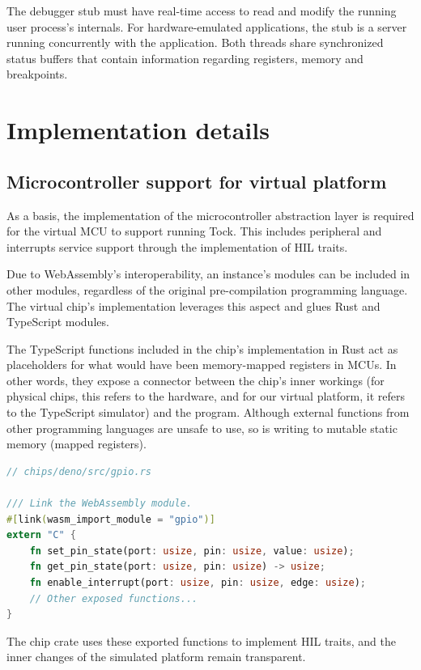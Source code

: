 \documentclass[12pt,a4paper]{report}
\begin{document}
The debugger stub must have real-time access to read and modify the running user process's internals. For hardware-emulated applications, the stub is a server running concurrently with the application. Both threads share synchronized status buffers that contain information regarding registers, memory and breakpoints.

\chapter{Implementation details}

\section{Microcontroller support for virtual platform}

As a basis, the implementation of the microcontroller abstraction layer is required for the virtual MCU to support running Tock. This includes peripheral and interrupts service support through the implementation of HIL traits.

Due to WebAssembly's interoperability, an instance's modules can be included in other modules, regardless of the original pre-compilation programming language. The virtual chip's implementation leverages this aspect and glues Rust and TypeScript modules. 

The TypeScript functions included in the chip's implementation in Rust act as placeholders for what would have been memory-mapped registers in MCUs. In other words, they expose a connector between the chip's inner workings (for physical chips, this refers to the hardware, and for our virtual platform, it refers to the TypeScript simulator) and the program. Although external functions from other programming languages are unsafe to use, so is writing  to mutable static memory (mapped registers).

\begin{lstlisting}[caption=TypeScript functions imported in Rust from the gpio module, language=Rust]
// chips/deno/src/gpio.rs

/// Link the WebAssembly module.
#[link(wasm_import_module = "gpio")]
extern "C" {
    fn set_pin_state(port: usize, pin: usize, value: usize);
    fn get_pin_state(port: usize, pin: usize) -> usize;
    fn enable_interrupt(port: usize, pin: usize, edge: usize);
    // Other exposed functions...
}
\end{lstlisting}

The chip crate uses these exported functions to implement HIL traits, and the inner changes of the simulated platform remain transparent. 
\end{document}
